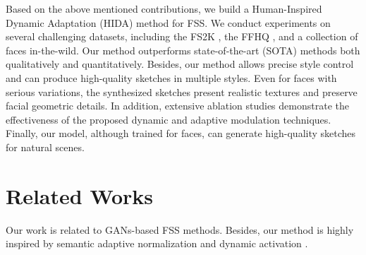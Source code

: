 \documentclass[10pt,twocolumn,letterpaper]{article}
\begin{document}
Based on the above mentioned contributions, we build a Human-Inspired Dynamic Adaptation (HIDA) method for FSS.
We conduct experiments on several challenging datasets, including the FS2K \cite{Fan2021FS2K}, the FFHQ \cite{Karras2018StyleGAN}, and a collection of faces in-the-wild. Our method outperforms state-of-the-art (SOTA) methods both qualitatively and quantitatively. Besides, our method allows precise style control and can produce high-quality sketches in multiple styles. Even for faces with serious variations, the synthesized sketches present realistic textures and preserve facial geometric details. In addition, extensive ablation studies demonstrate the effectiveness of the proposed dynamic and adaptive modulation techniques. Finally, our model, although trained for faces, can generate high-quality sketches for natural scenes. 


\section{Related Works}
\label{sec:related}
Our work is related to GANs-based FSS methods. Besides, our method is highly inspired by semantic adaptive normalization \cite{Park2019GauGAN} and dynamic activation \cite{ma2021acon}. 
\end{document}
